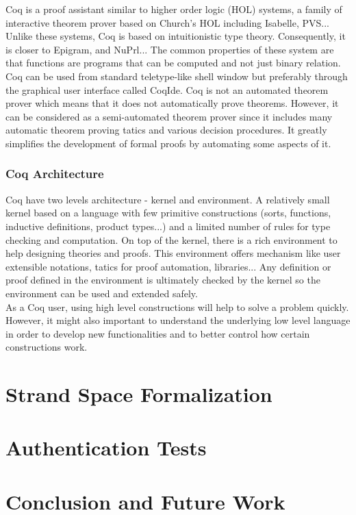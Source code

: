Coq is a proof assistant similar to higher order logic (HOL) systems, a family of interactive theorem prover based on Church's HOL including Isabelle, PVS... Unlike these systems, Coq is based on intuitionistic type theory. Consequently, it is closer to Epigram, and NuPrl... The common properties of these system are that functions are programs that can be computed and not just binary relation.
Coq can be used from standard teletype-like shell window but preferably through the graphical user interface called CoqIde. Coq is not an automated theorem prover which means that it does not automatically prove theorems. However, it can be considered as a semi-automated theorem prover since it includes many automatic theorem proving tatics and various decision procedures. It greatly simplifies the development of formal proofs by automating some aspects of it. 
\subsection{Coq Architecture}
Coq have two levels architecture - kernel and environment. A relatively small kernel based on a language with few primitive constructions (sorts, functions, inductive definitions, product types...) and a limited number of rules for type checking and computation. On top of the kernel, there is a rich environment to help designing theories and proofs. This environment offers mechanism like user extensible notations, tatics for proof automation, libraries... Any definition or proof defined in the environment is ultimately checked by the kernel so the environment can be used and extended safely.\\
As a Coq user, using high level constructions will help to solve a problem quickly. However, it might also important to understand the underlying low level language in order to develop new functionalities and to better control how certain constructions work. 
 
\chapter{Strand Space Formalization}


\chapter{Authentication Tests}

\chapter{Conclusion and Future Work}

